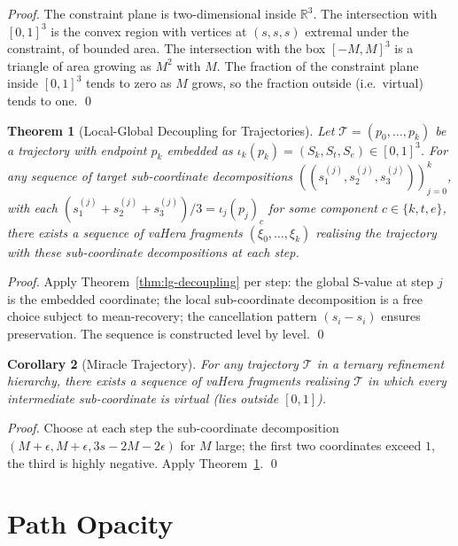 \documentclass[twocolumn,a4paper]{article}
\newtheorem{theorem}{Theorem}[section]
\newtheorem{corollary}[theorem]{Corollary}
\newcommand{\Real}{\mathbb{R}}
\newcommand{\Sk}{S_{k}}
\newcommand{\St}{S_{t}}
\newcommand{\Se}{S_{e}}
\newcommand{\Trajec}{\mathcal{T}}
\begin{document}
\begin{proof}
The constraint plane is two-dimensional inside $\Real^{3}$. The intersection with $[0,1]^{3}$ is the convex region with vertices at $(s,s,s)$ extremal under the constraint, of bounded area. The intersection with the box $[-M,M]^{3}$ is a triangle of area growing as $M^{2}$ with $M$. The fraction of the constraint plane inside $[0,1]^{3}$ tends to zero as $M$ grows, so the fraction outside (i.e.\ virtual) tends to one. \qed
\end{proof}

\begin{theorem}[Local-Global Decoupling for Trajectories]
\label{thm:lg-trajectory}
Let $\Trajec=(p_{0},\ldots,p_{k})$ be a trajectory with endpoint $p_{k}$ embedded as $\iota_{k}(p_{k})=(\Sk,\St,\Se)\in[0,1]^{3}$. For any sequence of target sub-coordinate decompositions $((s_{1}^{(j)},s_{2}^{(j)},s_{3}^{(j)}))_{j=0}^{k}$, with each $(s_{1}^{(j)}+s_{2}^{(j)}+s_{3}^{(j)})/3=\iota_{j}(p_{j})_{c}$ for some component $c\in\{k,t,e\}$, there exists a sequence of vaHera fragments $(\xi_{0},\ldots,\xi_{k})$ realising the trajectory with these sub-coordinate decompositions at each step.
\end{theorem}

\begin{proof}
Apply Theorem~\ref{thm:lg-decoupling} per step: the global S-value at step $j$ is the embedded coordinate; the local sub-coordinate decomposition is a free choice subject to mean-recovery; the cancellation pattern $(s_{i}-s_{i})$ ensures preservation. The sequence is constructed level by level. \qed
\end{proof}

\begin{corollary}[Miracle Trajectory]
\label{cor:miracle-trajectory}
For any trajectory $\Trajec$ in a ternary refinement hierarchy, there exists a sequence of vaHera fragments realising $\Trajec$ in which every intermediate sub-coordinate is virtual (lies outside $[0,1]$).
\end{corollary}

\begin{proof}
Choose at each step the sub-coordinate decomposition $(M+\epsilon,M+\epsilon,3s-2M-2\epsilon)$ for $M$ large; the first two coordinates exceed $1$, the third is highly negative. Apply Theorem~\ref{thm:lg-trajectory}. \qed
\end{proof}

\section{Path Opacity}
\label{sec:path-opacity}
\end{document}
